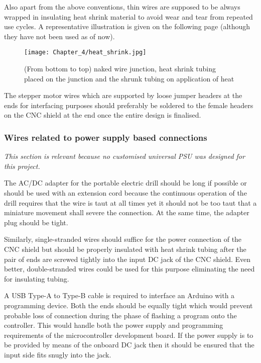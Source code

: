 Also apart from the above conventions, thin wires are supposed to be always wrapped in insulating heat shrink material to avoid wear and tear from repeated use cycles. A representative illustration is given on the following page (although they have not been used as of now). \par

\begin{figure}[h]
 \centering
 \texttt{[image: Chapter\_4/heat\_shrink.jpg]}
 \caption{(From bottom to top) naked wire junction, heat shrink tubing placed on the junction and the shrunk tubing on application of heat}
 \label{fig:shrink}
\end{figure}

The stepper motor wires which are supported by loose jumper headers at the ends for interfacing purposes should preferably be soldered to the female headers on the CNC shield at the end once the entire design is finalised.

\subsubsection*{Wires related to power supply based connections}

\textit{This section is relevant because no customised universal PSU was designed for this project.}

The AC/DC adapter for the portable electric drill should be long if possible or should be used with an extension cord because the continuous operation of the drill requires that the wire is taut at all times yet it should not be too taut that a miniature movement shall severe the connection. At the same time, the adapter plug should be tight. \par

Similarly, single-stranded wires should suffice for the power connection of the CNC shield but should be properly insulated with heat shrink tubing after the pair of ends are screwed tightly into the input DC jack of the CNC shield. Even better, double-stranded wires could be used for this purpose eliminating the need for insulating tubing. \par

A USB Type-A to Type-B cable is required to interface an Arduino with a programming device. Both the ends should be equally tight which would prevent probable loss of connection during the phase of flashing a program onto the controller. This would handle both the power supply and programming requirements of the microcontroller development board. If the power supply is to be provided by means of the onboard DC jack then it should be ensured that the input side fits snugly into the jack.

